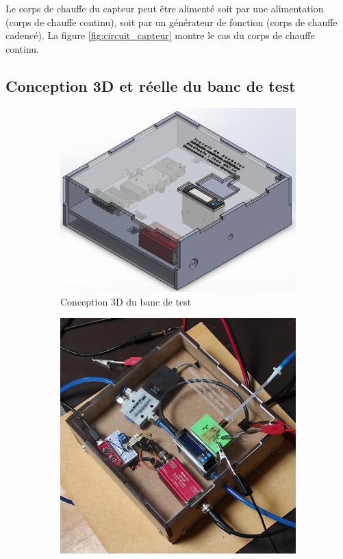 Le corps de chauffe du capteur peut être alimenté soit par une alimentation (corps de chauffe continu), soit par un générateur de fonction (corps 
de chauffe cadencé). La figure \ref{fig:circuit_capteur} montre le cas du corps de chauffe continu. 

\subsection{Conception 3D et réelle du banc de test}
\begin{figure}[H]
    \centering
    \begin{subfigure}{0.45\textwidth}
        \includegraphics[scale = 0.4]{assets/figures/Banc_de_test.png}
        \caption{Conception 3D du banc de test}
        \label{fig:3D_banc_test}
    \end{subfigure}
    \hspace{1cm}
    \begin{subfigure}{0.45\textwidth}
        \includegraphics[scale = 0.05, angle = -90]{assets/figures/Banc_de_test_real.png}

\end{subfigure}
\end{figure}
